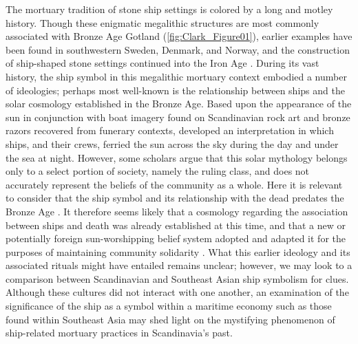 The mortuary tradition of stone ship settings is colored by a long and motley history. Though these enigmatic megalithic structures are most commonly associated with Bronze Age Gotland (\cref{fig:Clark_Figure01}),
earlier examples have been found in southwestern Sweden, Denmark, and Norway, and the construction of ship-shaped stone settings continued into the Iron Age \parencite[92]{Wehlin_2010}.
During its vast history, the ship symbol in this megalithic mortuary context embodied a number of ideologies; perhaps most well-known is the relationship between ships and the solar cosmology established in the Bronze Age. Based upon the appearance of the sun in conjunction with boat imagery found on Scandinavian rock art and bronze razors recovered from funerary contexts, \textcite{Kaul_1998} developed an interpretation in which ships, and their crews, ferried the sun across the sky during the day and under the sea at night.
However, some scholars argue that this solar mythology belongs only to a select portion of society, namely the ruling class, and does not accurately represent the beliefs of the community as a whole. Here it is relevant to consider that the ship symbol and its relationship with the dead predates the Bronze Age \parencite[34]{Westerdahl_2005}.
It therefore seems likely that a cosmology regarding the association between ships and death was already established at this time, and that a new or potentially foreign sun-worshipping belief system adopted and adapted it for the purposes of maintaining community solidarity \parencites[212--213]{Skoglund_2009}[41--42]{Westerdahl_2015}.
What this earlier ideology and its associated rituals might have entailed remains unclear; however, we may look to a comparison between Scandinavian and Southeast Asian ship symbolism \parencite{Ballard_2004} for clues. Although these cultures did not interact with one another, an examination of the significance of the ship as a symbol within a maritime economy such as those found within Southeast Asia may shed light on the mystifying phenomenon of ship-related mortuary practices in Scandinavia’s past.


